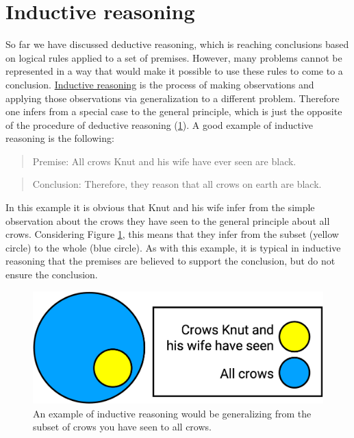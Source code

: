 \documentclass[
]{krantz}
\begin{document}
\section{Inductive reasoning}\label{inductive-reasoning}

So far we have discussed deductive reasoning, which is reaching conclusions based on logical rules applied to a set of premises. However, many problems cannot be represented in a way that would make it possible to use these rules to come to a conclusion. \hyperref[inductive-reasoning]{Inductive reasoning} is the process of making observations and applying those observations via generalization to a different problem. Therefore one infers from a special case to the general principle, which is just the opposite of the procedure of deductive reasoning (\ref{fig:induct}). A good example of inductive reasoning is the following:

\begin{quote}
Premise: All crows Knut and his wife have ever seen are black.
\end{quote}

\begin{quote}
Conclusion: Therefore, they reason that all crows on earth are black.
\end{quote}

In this example it is obvious that Knut and his wife infer from the simple observation about the crows they have seen to the general principle about all crows. Considering Figure \ref{fig:induct}, this means that they infer from the subset (yellow circle) to the whole (blue circle). As with this example, it is typical in inductive reasoning that the premises are believed to support the conclusion, but do not ensure the conclusion.

\begin{figure}

{\centering \includegraphics[width=0.6\linewidth]{images/ch9/fig4} 

}

\caption{An example of inductive reasoning would be generalizing from the subset of crows you have seen to all crows.}\label{fig:induct}
\end{figure}
\end{document}
